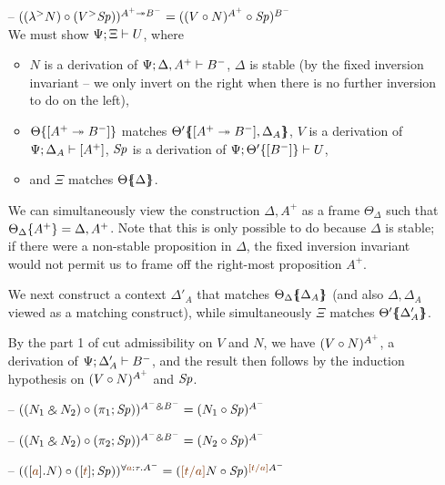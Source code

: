 \begin{itemize}
\item[--] $({({\lambda}^{>}{N})} \circ {({V}{^{>}}{{\it Sp}})})^{A^+ \twoheadrightarrow B^-} 
           = ({({V} \circ {N})^{A^+}} \circ {{\it Sp}})^{B^-}$\smallskip\\
  We must show ${\Psi};{\Xi} \vdash {U} \mathstrut$, where
  \begin{itemize}
  \item $N$ is a derivation of 
     ${\Psi};{{\Delta},{A^+}} \vdash {B^-} \mathstrut$, $\Delta$ is stable (by the fixed
     inversion invariant -- we only invert on the right when there is 
     no further inversion to do on the left), 
  \item ${\Theta}\{{[A^+ \twoheadrightarrow B^-]}\}$ matches 
     ${\Theta'}\mbox{$\{\hspace{-4pt}\{$}{{[A^+ \twoheadrightarrow B^-]},{\Delta_A}}\mbox{$\}\hspace{-4pt}\}$}$, 
     $V$ is a derivation of ${\Psi};{\Delta_A} \vdash {[A^+]} \mathstrut$,
     ${\it Sp}$ is a derivation of ${\Psi};{{\Theta'}\{{[B^-]}\}} \vdash {U} \mathstrut$,
  \item and $\Xi$ matches ${\Theta}\mbox{$\{\hspace{-4pt}\{$}{\Delta}\mbox{$\}\hspace{-4pt}\}$}$.
  \end{itemize}
  We can simultaneously view the construction $\Delta,A^+$ as a frame
  $\Theta_\Delta$ such that ${\Theta_\Delta}\{{A^+}\} =
  \Delta,A^+$.  Note that this is only possible to do because $\Delta$
  is stable; if there were a non-stable proposition in $\Delta$, the
  fixed inversion invariant would not permit us to frame off the
  right-most proposition $A^+$.

  We next construct a context $\Delta'_A$ that matches
  ${\Theta_\Delta}\mbox{$\{\hspace{-4pt}\{$}{\Delta_A}\mbox{$\}\hspace{-4pt}\}$}$ (and also $\Delta, \Delta_A$ viewed
  as a matching construct), while simultaneously
  $\Xi$ matches ${\Theta'}\mbox{$\{\hspace{-4pt}\{$}{\Delta'_A}\mbox{$\}\hspace{-4pt}\}$}$. 

  By the part 1 of cut admissibility
  on $V$ and $N$, we have $({V} \circ {N})^{A^+}$, a derivation of 
  ${\Psi};{\Delta'_A} \vdash {B^-} \mathstrut$, and 
  the result then follows by the induction hypothesis on 
  $({V} \circ {N})^{A^+}$ and ${\it Sp}$.  \smallskip

\item[--] $({({N_1} \mathbin{\binampersand} {N_2})} \circ {(\pi_1;{{\it Sp}})})^{A^- \mathbin{\binampersand} B^-}
           = ({N_1} \circ {{\it Sp}})^{A^-}$

\item[--] $({({N_1} \mathbin{\binampersand} {N_2})} \circ {(\pi_2;{{\it Sp}})})^{A^- \mathbin{\binampersand} B^-}
           = ({N_2} \circ {{\it Sp}})^{A^-}$

\item[--] $(\subst{(\tforallr{\lf a}{N})}{(\tforalll{\lf t}{\Sp})})^{\forall \lf{a}{:}\tau.A^-}
           = (\subst{\lf{[t/a]}N}{\Sp})^{\lf{[t/a]}A^-}$
\end{itemize}

